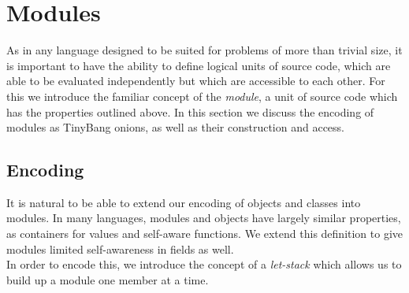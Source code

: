 \documentclass{llncs}
\newcommand{\translate}[2]{\ensuremath{\llbracket\texttt{#2}\rrbracket_{\textnormal{#1}}}}
\begin{document}
\section{Modules}
\label{sec-modules}
\indent As in any language designed to be suited for problems of more than trivial size, it is important to have the ability to define logical units of source code, which are able to be evaluated independently but which are accessible to each other. For this we introduce the familiar concept of the \textit{module}, a unit of source code which has the properties outlined above. In this section we discuss the encoding of modules as TinyBang onions, as well as their construction and access.

\subsection{Encoding}
\label{ss-mod-encoding}
%
% 
\indent It is natural to be able to extend our encoding of objects and classes into modules. In many languages, modules and objects have largely similar properties, as containers for values and self-aware functions. We extend this definition to give modules limited self-awareness in fields as well.\\
\indent In order to encode this, we introduce the concept of a \textit{let-stack} which allows us to build up a module one member at a time.
\end{document}
